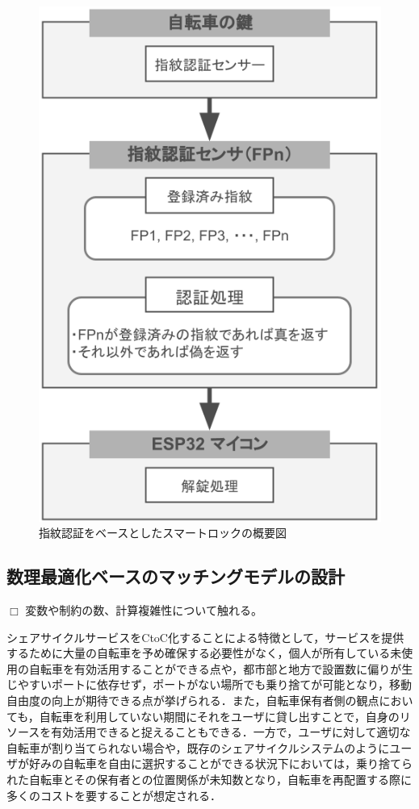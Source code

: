           \begin{figure}[htbp]
            \centering
            \includegraphics[scale=0.46]
            {figures/overallImageOfFingerprintUnlock.png}
            \caption{指紋認証をベースとしたスマートロックの概要図}
            \label{fig:指紋認証をベースとしたスマートロックの概要図}
          \end{figure}
          
  \subsection{数理最適化ベースのマッチングモデルの設計}
    \label{sec:数理最適化ベースのマッチングモデルの設計}
      \par $\Box$ 変数や制約の数、計算複雑性について触れる。
      \par シェアサイクルサービスをCtoC化することによる特徴として，サービスを提供するために大量の自転車を予め確保する必要性がなく，個人が所有している未使用の自転車を有効活用することができる点や，都市部と地方で設置数に偏りが生じやすいポートに依存せず，ポートがない場所でも乗り捨てが可能となり，移動自由度の向上が期待できる点が挙げられる．また，自転車保有者側の観点においても，自転車を利用していない期間にそれをユーザに貸し出すことで，自身のリソースを有効活用できると捉えることもできる．一方で，ユーザに対して適切な自転車が割り当てられない場合や，既存のシェアサイクルシステムのようにユーザが好みの自転車を自由に選択することができる状況下においては，乗り捨てられた自転車とその保有者との位置関係が未知数となり，自転車を再配置する際に多くのコストを要することが想定される．
          
